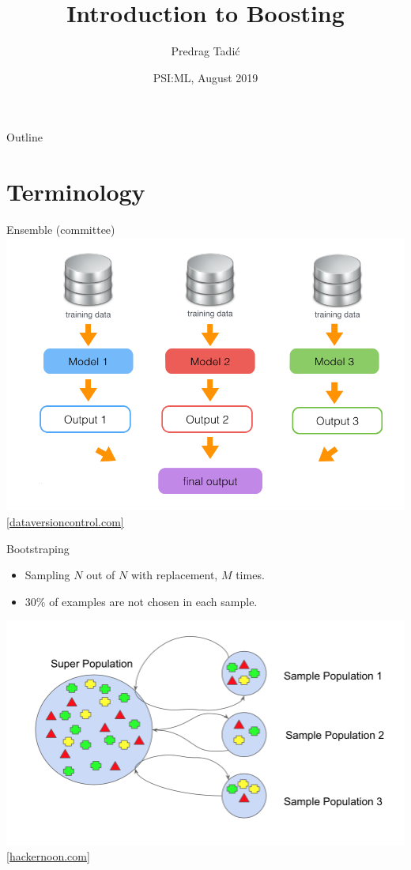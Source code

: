 \documentclass[handout]{beamer}
\title{Introduction to Boosting}
\author{Predrag Tadi\'{c}}
\institute{
	School of Electrical Engineering\\
	University of Belgrade
}
\date{PSI:ML, August 2019}
\newcommand{\hreftextsize}{\footnotesize}
\newcommand{\myhref}[2]{\href{#1}{\hreftextsize #2}}
\begin{document}
\begin{frame}
	\titlepage
\end{frame}

\begin{frame}{Outline}
	\tableofcontents
\end{frame}

\section{Terminology}

\begin{frame}{Ensemble (committee)}
	\centering
	\includegraphics[width=\textwidth]{figs/ensemble}
	\\
	\myhref{https://blog.dataversioncontrol.com/ml-model-ensembling-with-fast-iterations-91e8cad6a9b5}{[dataversioncontrol.com]}
\end{frame}

\begin{frame}{Bootstraping}
\begin{itemize}
	\item Sampling $ N $ out of $ N $ with replacement, $ M $ times.
	\item $ 30\% $ of examples are not chosen in each sample.
\end{itemize}
	\centering
	\includegraphics[width=\textwidth]{figs/bootstraping}
	\\
	\myhref{https://hackernoon.com/how-to-develop-a-robust-algorithm-c38e08f32201}{[hackernoon.com]}
\end{frame}
\end{document}
